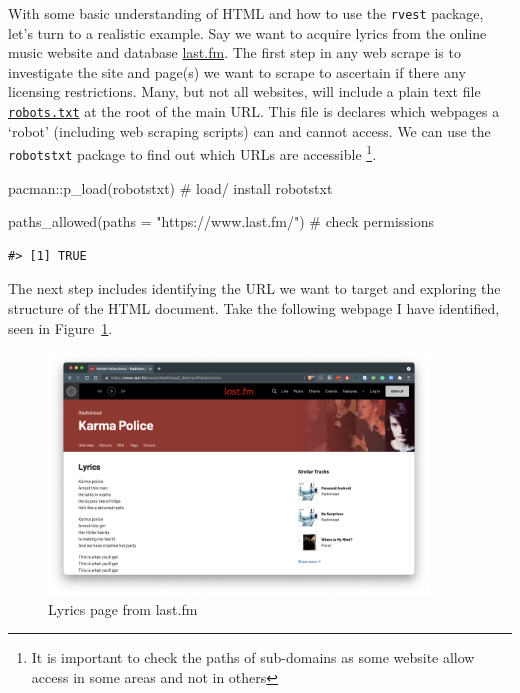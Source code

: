 \documentclass[
  letterpaper,
]{latex/krantz}
\newenvironment{Shaded}{\begin{snugshade}}{\end{snugshade}}
\newcommand{\AttributeTok}[1]{\textcolor[rgb]{0.40,0.45,0.13}{#1}}
\newcommand{\CommentTok}[1]{\textcolor[rgb]{0.37,0.37,0.37}{#1}}
\newcommand{\FunctionTok}[1]{\textcolor[rgb]{0.28,0.35,0.67}{#1}}
\newcommand{\NormalTok}[1]{\textcolor[rgb]{0.00,0.23,0.31}{#1}}
\newcommand{\SpecialCharTok}[1]{\textcolor[rgb]{0.37,0.37,0.37}{#1}}
\newcommand{\StringTok}[1]{\textcolor[rgb]{0.13,0.47,0.30}{#1}}
\begin{document}
With some basic understanding of HTML and how to use the \texttt{rvest}
package, let's turn to a realistic example. Say we want to acquire
lyrics from the online music website and database
\href{https://www.last.fm/}{last.fm}. The first step in any web scrape
is to investigate the site and page(s) we want to scrape to ascertain if
there any licensing restrictions. Many, but not all websites, will
include a plain text file
\href{https://www.cloudflare.com/learning/bots/what-is-robots.txt/}{\texttt{robots.txt}}
at the root of the main URL. This file is declares which webpages a
`robot' (including web scraping scripts) can and cannot access. We can
use the \texttt{robotstxt} package to find out which URLs are accessible
\footnote{It is important to check the paths of sub-domains as some
  website allow access in some areas and not in others}.

\begin{Shaded}
\begin{Highlighting}[]
\NormalTok{pacman}\SpecialCharTok{::}\FunctionTok{p\_load}\NormalTok{(robotstxt) }\CommentTok{\# load/ install \textasciigrave{}robotstxt\textasciigrave{}}

\FunctionTok{paths\_allowed}\NormalTok{(}\AttributeTok{paths =} \StringTok{"https://www.last.fm/"}\NormalTok{) }\CommentTok{\# check permissions}
\end{Highlighting}
\end{Shaded}

\begin{verbatim}
#> [1] TRUE
\end{verbatim}

The next step includes identifying the URL we want to target and
exploring the structure of the HTML document. Take the following webpage
I have identified, seen in
Figure~\ref{fig-ad-example-lyrics-page-lastfm}.

\begin{figure}[h]

{\centering \includegraphics[width=0.9\textwidth,height=\textheight]{./figures/acquire-data/ad-lastfm-webpage-lyrics.png}

}

\caption{\label{fig-ad-example-lyrics-page-lastfm}Lyrics page from
last.fm}

\end{figure}
\end{document}
